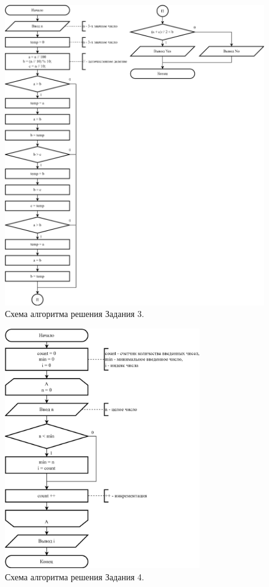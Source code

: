 \documentclass[oneside,a4paper,14pt]{extarticle}
\begin{document}
\begin{figure}
	\centering
	\includegraphics[width=\textwidth]{img/3-scheme.png} %
	\caption{Схема алгоритма решения Задания 3.} %
\end{figure}
\begin{figure}
	\centering
	\includegraphics[width=0.75\textwidth]{img/4-scheme.png} %
	\caption{Схема алгоритма решения Задания 4.} %
\end{figure}
\end{document}
